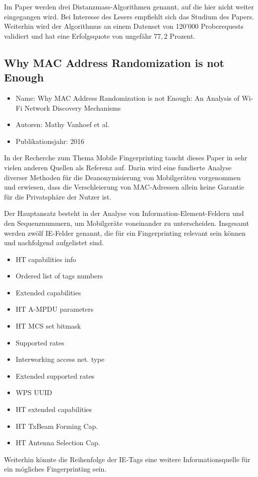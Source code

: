 Im Paper werden drei Distanzmass-Algorithmen genannt, 
auf die hier nicht weiter eingegangen wird. 
Bei Interesse des Lesers empfiehlt sich das Studium des Papers.
Weiterhin wird der Algorithmus an einem Datenset von 120'000 Proberequests
validiert und hat eine Erfolgsquote von ungefähr $77,2$ Prozent.

\clearpage 

\subsection{Why MAC Address Randomization is not Enough}
\begin{itemize}
    \item Name: Why MAC Address Randomization is not Enough: 
    An Analysis of Wi-Fi Network Discovery Mechanisms
    \item Autoren: Mathy Vanhoef et al.
    \item Publikationsjahr: 2016
\end{itemize}

In der Recherche zum Thema Mobile Fingerprinting taucht dieses Paper in 
sehr vielen anderen Quellen als Referenz auf. 
Darin wird eine fundierte Analyse diverser Methoden für die Deanonymisierung
von Mobilgeräten vorgenommen und erwiesen, dass die Verschleierung von 
MAC-Adressen allein keine Garantie für die Privatsphäre der Nutzer ist.

Der Hauptansatz besteht in der Analyse von Information-Element-Feldern
und den Sequenznummern, um Mobilgeräte voneinander zu unterscheiden.
Insgesamt werden zwölf IE-Felder genannt, die für ein Fingerprinting 
relevant sein können und nachfolgend aufgelistet sind.
\begin{itemize}
    \item HT capabilities info 
    \item Ordered list of tags numbers 
    \item Extended capabilities
    \item HT A-MPDU parameters 
    \item HT MCS set bitmask
    \item Supported rates 
    \item Interworking access net. type
    \item Extended supported rates 
    \item WPS UUID 
    \item HT extended capabilities
    \item HT TxBeam Forming Cap. 
    \item HT Antenna Selection Cap.
\end{itemize}
Weiterhin könnte die Reihenfolge der IE-Tags eine weitere Informationsquelle 
für ein mögliches Fingerprinting sein.


